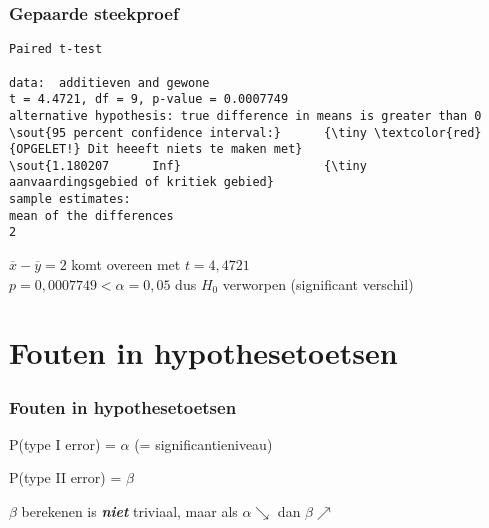 \documentclass[aspectratio=169]{beamer}
\begin{document}
\begin{frame}[fragile]
  \frametitle{Gepaarde steekproef}

{\footnotesize
\begin{Verbatim}[commandchars=\\\{\}]
Paired t-test

data:  additieven and gewone
t = 4.4721, df = 9, p-value = 0.0007749
alternative hypothesis: true difference in means is greater than 0
\sout{95 percent confidence interval:}      {\tiny \textcolor{red}{OPGELET!} Dit heeeft niets te maken met}
\sout{1.180207      Inf}                    {\tiny   aanvaardingsgebied of kritiek gebied}
sample estimates:
mean of the differences 
2
\end{Verbatim}
}
\vfill
$\overline{x}-\overline{y}=2$ komt overeen met $t=4,4721$\\
$p = 0,0007749 < \alpha = 0,05$ dus $H_0$ verworpen (significant verschil)
\end{frame}

\section{Fouten in hypothesetoetsen}

\begin{frame}
  \frametitle{Fouten in hypothesetoetsen}

  \begin{table}
    \centering
    \label{tab:hypfouten}
  \end{table}

  P(type I error) = $\alpha$ (= significantieniveau)
  
  P(type II error) = $\beta$
  
  $\beta$ berekenen is \textbf{\textit{niet}} triviaal, maar als $\alpha \searrow$ dan $\beta \nearrow$ 
\end{frame}
\end{document}
